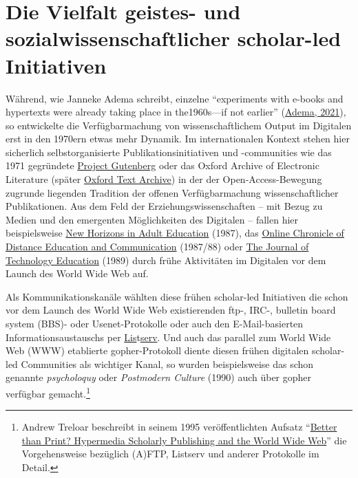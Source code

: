 \documentclass[a4paper,
fontsize=11pt,
oneside,
numbers=noperiodatend,
parskip=half-,
bibliography=totoc,
final
]{scrartcl}
\begin{document}
\hypertarget{die-vielfalt-geistes--und-sozialwissenschaftlicher-scholar-led-initiativen}{%
\section{Die Vielfalt geistes- und sozialwissenschaftlicher
scholar-led
Initiativen}\label{die-vielfalt-geistes--und-sozialwissenschaftlicher-scholar-led-initiativen}}

Während, wie Janneke Adema schreibt, einzelne \enquote{experiments with
e-books and hypertexts were already taking place in the1960s---if not
earlier} (\href{https://doi.org/10.7551/mitpress/11297.003.0005}{Adema,
2021}), so entwickelte die Verfügbarmachung von wissenschaftlichem
Output im Digitalen erst in den 1970ern etwas mehr Dynamik. Im
internationalen Kontext stehen hier sicherlich selbstorganisierte
Publikationsinitiativen und -communities wie das 1971 gegründete
\href{https://www.gutenberg.org/about/}{Project Gutenberg} oder das
Oxford Archive of Electronic Literature (später
\href{https://ota.bodleian.ox.ac.uk/repository/xmlui/page/about}{Oxford
Text Archive}) in der der Open-Access-Bewegung zugrunde liegenden
Tradition der offenen Verfügbarmachung wissenschaftlicher Publikationen.
Aus dem Feld der Erziehungswissenschaften -- mit Bezug zu Medien und den
emergenten Möglichkeiten des Digitalen -- fallen hier beispielsweise
\href{https://web.archive.org/web/20120701192019/http://education.fiu.edu/newhorizons/journals/vol1n1.txt}{New
Horizons in Adult Education} (1987), das
\href{https://jasonohler.com/OJournal/\#april\%2088}{Online Chronicle of
Distance Education and Communication} (1987/88) oder
\href{https://web.archive.org/web/19970127015651/http://borg.lib.vt.edu/ejournals/JTE/jte-v1n1/contents.jte-v1n1.html}{The
Journal of Technology Education} (1989) durch frühe Aktivitäten im
Digitalen vor dem Launch des World Wide Web auf.

Als Kommunikationskanäle wählten diese frühen scholar-led Initiativen
die schon vor dem Launch des World Wide Web existierenden ftp-, IRC-,
bulletin board system (BBS)- oder Usenet-Protokolle oder auch den
E-Mail-basierten Informationsaustauschs per
\href{https://en.wikipedia.org/wiki/LISTSERV}{Lis}t\href{https://en.wikipedia.org/wiki/LISTSERV}{serv}.
Und auch das parallel zum World Wide Web (WWW) etablierte
gopher-Protokoll diente diesen frühen digitalen scholar-led Communities
als wichtiger Kanal, so wurden beispielsweise das schon genannte
\emph{psycholoquy} oder \emph{Postmodern Culture} (1990) auch über
gopher verfügbar gemacht.\footnote{Andrew Treloar beschreibt in seinem
  1995 veröffentlichten Aufsatz
  \enquote{\href{https://andrew.treloar.net/research/publications/vala96/index.html}{Better
  than Print? Hypermedia Scholarly Publishing and the World Wide Web}}
  die Vorgehensweise bezüglich (A)FTP, Listserv und anderer Protokolle
  im Detail.}
\end{document}
